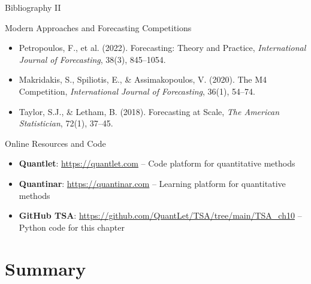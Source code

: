 \documentclass[9pt, aspectratio=169, t]{beamer}
\begin{document}
\begin{frame}{Bibliography II}
    \begin{block}{Modern Approaches and Forecasting Competitions}
        {\small
        \begin{itemize}
            \item Petropoulos, F., et al. (2022). Forecasting: Theory and Practice, \textit{International Journal of Forecasting}, 38(3), 845--1054.
            \item Makridakis, S., Spiliotis, E., \& Assimakopoulos, V. (2020). The M4 Competition, \textit{International Journal of Forecasting}, 36(1), 54--74.
            \item Taylor, S.J., \& Letham, B. (2018). Forecasting at Scale, \textit{The American Statistician}, 72(1), 37--45.
        \end{itemize}
        }
    \end{block}

    \begin{exampleblock}{Online Resources and Code}
        {\small
        \begin{itemize}\setlength{\itemsep}{0pt}
            \item \textbf{Quantlet}: \url{https://quantlet.com} -- Code platform for quantitative methods
            \item \textbf{Quantinar}: \url{https://quantinar.com} -- Learning platform for quantitative methods
            \item \textbf{GitHub TSA}: \url{https://github.com/QuantLet/TSA/tree/main/TSA_ch10} -- Python code for this chapter
        \end{itemize}
        }
    \end{exampleblock}
\end{frame}

\section{Summary}
\end{document}
